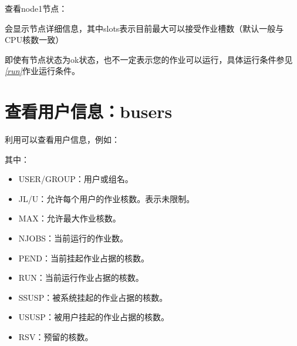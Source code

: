 \documentclass[a4paper,12pt,english]{sphinxmanual}
\begin{document}
\sphinxAtStartPar
查看node1节点：

\sphinxAtStartPar
{}会显示节点详细信息，其中slots表示目前最大可以接受作业槽数（默认一般与CPU核数一致）

\sphinxAtStartPar
即使有节点状态为ok状态，也不一定表示您的作业可以运行，具体运行条件参见{\hyperref[\detokenize{lsf/lsf:run}]{\emph{{[}run{]}}}}作业运行条件。


\section{查看用户信息：busers}
\label{\detokenize{lsf/lsf:busers}}
\sphinxAtStartPar
利用可以查看用户信息，例如：

\sphinxAtStartPar
{}

\begin{sphinxVerbatim}[commandchars=\\\{\}]
        
                                             
\end{sphinxVerbatim}

\sphinxAtStartPar
其中：
\begin{itemize}
\item {} 
\sphinxAtStartPar
USER/GROUP：用户或组名。

\item {} 
\sphinxAtStartPar
JL/U：允许每个用户的作业核数。\sphinxhyphen{}表示未限制。

\item {} 
\sphinxAtStartPar
MAX：允许最大作业核数。

\item {} 
\sphinxAtStartPar
NJOBS：当前运行的作业数。

\item {} 
\sphinxAtStartPar
PEND：当前挂起作业占据的核数。

\item {} 
\sphinxAtStartPar
RUN：当前运行作业占据的核数。

\item {} 
\sphinxAtStartPar
SSUSP：被系统挂起的作业占据的核数。

\item {} 
\sphinxAtStartPar
USUSP：被用户挂起的作业占据的核数。

\item {} 
\sphinxAtStartPar
RSV：预留的核数。

\end{itemize}
\end{document}

